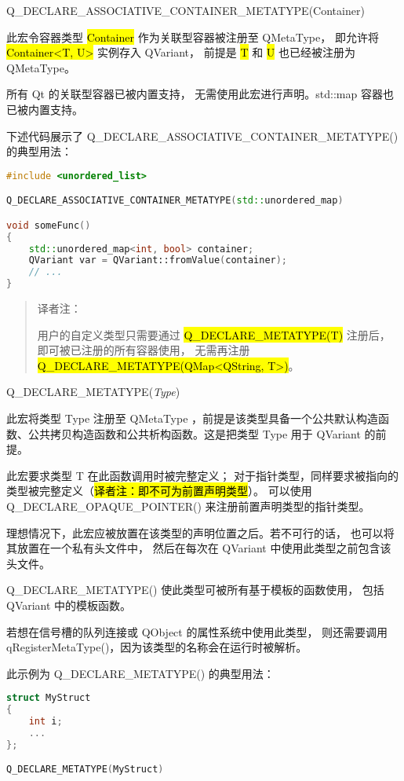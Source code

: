 Q\_DECLARE\_ASSOCIATIVE\_CONTAINER\_METATYPE(Container)

此宏令容器类型 \hl{Container} 作为关联型容器被注册至 QMetaType，
即允许将 \hl{Container<T, U>} 实例存入 QVariant，
前提是 \hl{T} 和 \hl{U} 也已经被注册为 QMetaType。

\begin{warning}
所有 Qt 的关联型容器已被内置支持，
无需使用此宏进行声明。std::map 容器也已被内置支持。
\end{warning}

下述代码展示了 Q\_DECLARE\_ASSOCIATIVE\_CONTAINER\_METATYPE() 的典型用法：

\begin{lstlisting}[language=C++]
#include <unordered_list>

Q_DECLARE_ASSOCIATIVE_CONTAINER_METATYPE(std::unordered_map)

void someFunc()
{
    std::unordered_map<int, bool> container;
    QVariant var = QVariant::fromValue(container);
    // ...
}
\end{lstlisting}

\begin{quote}
译者注：

用户的自定义类型只需要通过 \hl{Q\_DECLARE\_METATYPE(T)} 注册后，
即可被已注册的所有容器使用，
无需再注册 \hl{Q\_DECLARE\_METATYPE(QMap<QString, T>)}。
\end{quote}

Q\_DECLARE\_METATYPE(\emph{Type})

此宏将类型 Type 注册至 QMetaType ，前提是该类型具备一个公共默认构造函数、公共拷贝构造函数和公共析构函数。这是把类型 Type 用于 QVariant 的前提。

此宏要求类型 T 在此函数调用时被完整定义；
对于指针类型，同样要求被指向的类型被完整定义（\hl{译者注：即不可为前置声明类型}）。
可以使用 Q\_DECLARE\_OPAQUE\_POINTER() 来注册前置声明类型的指针类型。

理想情况下，此宏应被放置在该类型的声明位置之后。若不可行的话，
也可以将其放置在一个私有头文件中，
然后在每次在 QVariant 中使用此类型之前包含该头文件。

Q\_DECLARE\_METATYPE() 使此类型可被所有基于模板的函数使用，
包括 QVariant 中的模板函数。

\begin{notice}
若想在信号槽的队列连接或 QObject 的属性系统中使用此类型，
则还需要调用 qRegisterMetaType()，因为该类型的名称会在运行时被解析。
\end{notice}

此示例为 Q\_DECLARE\_METATYPE() 的典型用法：

\begin{lstlisting}[language=C++]
struct MyStruct
{
    int i;
    ...
};

Q_DECLARE_METATYPE(MyStruct)
\end{lstlisting}